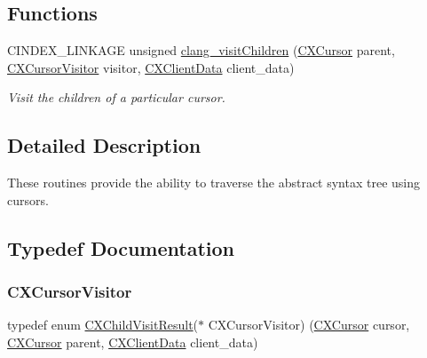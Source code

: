 \subsection*{Functions}
\begin{DoxyCompactItemize}
\item 
C\+I\+N\+D\+E\+X\+\_\+\+L\+I\+N\+K\+A\+GE unsigned \hyperlink{group__CINDEX__CURSOR__TRAVERSAL_ga5d0a813d937e1a7dcc35f206ad1f7a91}{clang\+\_\+visit\+Children} (\hyperlink{structCXCursor}{C\+X\+Cursor} parent, \hyperlink{group__CINDEX__CURSOR__TRAVERSAL_gabf842c9ee20048b596eb9dfe94bb1570}{C\+X\+Cursor\+Visitor} visitor, \hyperlink{group__CINDEX_gacfa40c3de26d228c0d898403c2c21612}{C\+X\+Client\+Data} client\+\_\+data)
\begin{DoxyCompactList}\small\item\em Visit the children of a particular cursor. \end{DoxyCompactList}\end{DoxyCompactItemize}


\subsection{Detailed Description}
These routines provide the ability to traverse the abstract syntax tree using cursors. 

\subsection{Typedef Documentation}
\mbox{\label{group__CINDEX__CURSOR__TRAVERSAL_gabf842c9ee20048b596eb9dfe94bb1570}} 
\subsubsection{\texorpdfstring{C\+X\+Cursor\+Visitor}{CXCursorVisitor}}
{\footnotesize\ttfamily typedef enum \hyperlink{group__CINDEX__CURSOR__TRAVERSAL_ga99a9058656e696b622fbefaf5207d715}{C\+X\+Child\+Visit\+Result}($\ast$ C\+X\+Cursor\+Visitor) (\hyperlink{structCXCursor}{C\+X\+Cursor} cursor, \hyperlink{structCXCursor}{C\+X\+Cursor} parent, \hyperlink{group__CINDEX_gacfa40c3de26d228c0d898403c2c21612}{C\+X\+Client\+Data} client\+\_\+data)}



